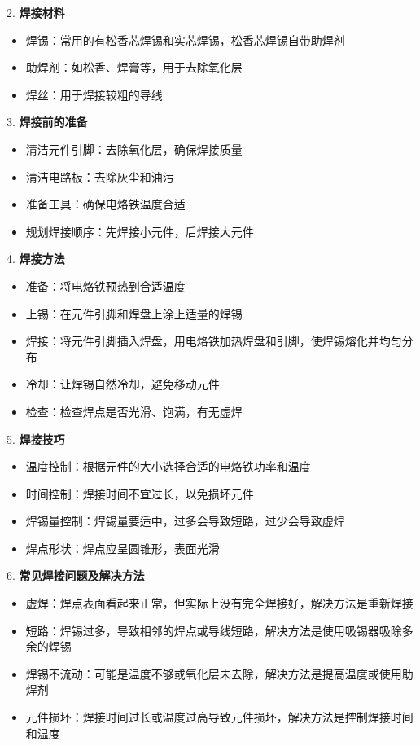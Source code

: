 \documentclass[12pt,UTF8]{ctexbook}
\begin{document}
2. \textbf{焊接材料}
   \begin{itemize}[leftmargin=3.5em]
   \item 焊锡：常用的有松香芯焊锡和实芯焊锡，松香芯焊锡自带助焊剂
   \item 助焊剂：如松香、焊膏等，用于去除氧化层
   \item 焊丝：用于焊接较粗的导线
   \end{itemize}

3. \textbf{焊接前的准备}
   \begin{itemize}[leftmargin=3.5em]
   \item 清洁元件引脚：去除氧化层，确保焊接质量
   \item 清洁电路板：去除灰尘和油污
   \item 准备工具：确保电烙铁温度合适
   \item 规划焊接顺序：先焊接小元件，后焊接大元件
   \end{itemize}

4. \textbf{焊接方法}
   \begin{itemize}[leftmargin=3.5em]
   \item 准备：将电烙铁预热到合适温度
   \item 上锡：在元件引脚和焊盘上涂上适量的焊锡
   \item 焊接：将元件引脚插入焊盘，用电烙铁加热焊盘和引脚，使焊锡熔化并均匀分布
   \item 冷却：让焊锡自然冷却，避免移动元件
   \item 检查：检查焊点是否光滑、饱满，有无虚焊
   \end{itemize}

5. \textbf{焊接技巧}
   \begin{itemize}[leftmargin=3.5em]
   \item 温度控制：根据元件的大小选择合适的电烙铁功率和温度
   \item 时间控制：焊接时间不宜过长，以免损坏元件
   \item 焊锡量控制：焊锡量要适中，过多会导致短路，过少会导致虚焊
   \item 焊点形状：焊点应呈圆锥形，表面光滑
   \end{itemize}

6. \textbf{常见焊接问题及解决方法}
   \begin{itemize}[leftmargin=3.5em]
   \item 虚焊：焊点表面看起来正常，但实际上没有完全焊接好，解决方法是重新焊接
   \item 短路：焊锡过多，导致相邻的焊点或导线短路，解决方法是使用吸锡器吸除多余的焊锡
   \item 焊锡不流动：可能是温度不够或氧化层未去除，解决方法是提高温度或使用助焊剂
   \item 元件损坏：焊接时间过长或温度过高导致元件损坏，解决方法是控制焊接时间和温度
   \end{itemize}
\end{document}
